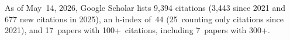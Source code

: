 %
As of May~14, 2026, Google Scholar lists
9,394 citations (3,443 since 2021 and 677 new citations in 2025),
an h-index of~44 (25~counting only citations since 2021),
and 17~papers with 100+~citations, including 7~papers with 300+.
